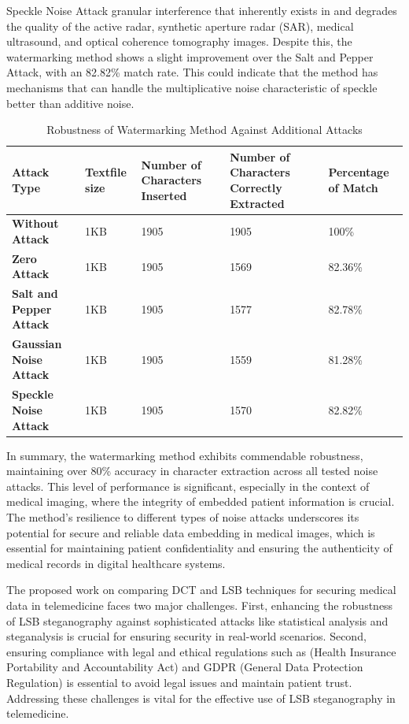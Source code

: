 \documentclass{ieeeaccess}
\begin{document}
Speckle Noise Attack granular interference that inherently exists in and degrades the quality of the active radar, synthetic aperture radar (SAR), medical ultrasound, and optical coherence tomography images. Despite this, the watermarking method shows a slight improvement over the Salt and Pepper Attack, with an 82.82\% match rate. This could indicate that the method has mechanisms that can handle the multiplicative noise characteristic of speckle better than additive noise.

\begin{table}[h!]
\centering
\caption{Robustness of Watermarking Method Against Additional Attacks}
\begin{tabular}{|m{1.3cm}|m{0.8cm}|m{1.0cm}|m{1.3cm}|m{1.2cm}|}
\hline
\textbf{Attack Type}& \textbf{Textfile size} & \textbf{Number of Characters Inserted} & \textbf{Number of Characters Correctly Extracted} & \textbf{Percentage of Match} \\
\hline
\textbf{Without Attack} &1KB & 1905 & 1905 & 100\% \\\hline
\textbf{Zero Attack} & 1KB & 1905 & 1569 & 82.36\% \\\hline
\textbf{Salt and Pepper Attack} & 1KB &1905 & 1577 & 82.78\% \\\hline
\textbf{Gaussian Noise Attack} & 1KB &1905 & 1559 & 81.28\% \\\hline
\textbf{Speckle Noise Attack} & 1KB &1905 & 1570 & 82.82\% \\
\hline
\end{tabular}

\label{table:1}
\end{table}

\par In summary, the watermarking method exhibits commendable robustness, maintaining over 80\% accuracy in character extraction across all tested noise attacks. This level of performance is significant, especially in the context of medical imaging, where the integrity of embedded patient information is crucial. The method's resilience to different types of noise attacks underscores its potential for secure and reliable data embedding in medical images, which is essential for maintaining patient confidentiality and ensuring the authenticity of medical records in digital healthcare systems.

The proposed work on comparing DCT  and LSB techniques for securing medical data in telemedicine faces two major challenges. First, enhancing the robustness of LSB steganography against sophisticated attacks like statistical analysis and steganalysis is crucial for ensuring security in real-world scenarios. Second, ensuring compliance with legal and ethical regulations such as (Health Insurance Portability and Accountability Act) and GDPR (General Data Protection Regulation) is essential to avoid legal issues and maintain patient trust. Addressing these challenges is vital for the effective use of LSB steganography in telemedicine.
\end{document}
